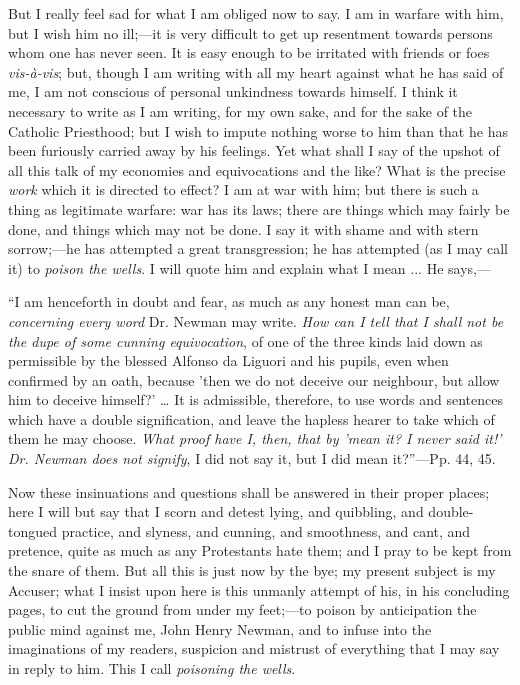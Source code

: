 But I really feel sad for what I am
obliged now to say. I am in warfare with him, but I wish him no ill;—it
is very difficult to get up resentment towards persons whom one has
never seen. It is easy enough to be irritated with friends or foes \emph{vis-à-vis};
but, though I am writing with all my heart against what he has said of
me, I am not conscious of personal unkindness towards himself. I think
it necessary to write as I am writing, for my own sake, and for the
sake of the Catholic Priesthood; but I wish to impute nothing worse to
him than that he has been furiously carried away by his feelings.
Yet what shall I say of the upshot of all this talk of my economies
and equivocations and the like? What is the precise \emph{work} which
it is directed to effect? I am at war with him; but there is such a
thing as legitimate warfare: war has its laws; there are things which
may fairly be done, and things which may not be done. I say it with shame
and with stern sorrow;—he has attempted a great transgression; he
has attempted (as I may call it) to \emph{poison the wells}. I will quote
him and explain what I mean ... He says,—

``I am henceforth in doubt and fear,
as much as any honest man can be, \emph{concerning every word} Dr.
Newman may write. \emph{How can I tell that I shall not be the dupe of
some cunning equivocation}, of one of the three kinds laid down as
permissible by the blessed Alfonso da Liguori and his pupils, even
when confirmed by an oath, because 'then we do not deceive our
neighbour, but allow him to deceive himself?' … It is
admissible, therefore, to use words and sentences which have a double
signification, and leave the hapless hearer to take which of them he
may choose. \emph{What proof have I, then, that by 'mean it? I never said
it!' Dr. Newman does not signify}, I did not say it, but I did mean
it?''—Pp. 44, 45.

Now these insinuations and questions shall be answered in their
proper places; here I will but say that I scorn and detest lying, and
quibbling, and double-tongued practice, and slyness, and cunning, and
smoothness, and cant, and pretence, quite as much as any Protestants
hate them; and I pray to be kept from the snare of them. But all this
is just now by the bye; my present subject is my Accuser; what I
insist upon here is this unmanly attempt of his, in his concluding pages,
to cut the ground from under my feet;—to poison by anticipation the
public mind against me, John Henry Newman, and to infuse into the
imaginations of my readers, suspicion and mistrust of everything that
I may say in reply to him. This I call \emph{poisoning the wells}.

